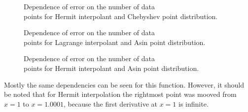 \documentclass[10pt]{article}
\begin{document}
\begin{figure}[H]
\begin{minipage}[h]{0.45\linewidth}
			\caption{Dependence of error on the number of data\\ points for Hermit interpolant and Chebyshev point distribution.}
		\end{minipage}%
		\vfill
		\begin{minipage}[h]{0.45\linewidth}
			\caption{Dependence of error on the number of data\\ points for Lagrange interpolant and Asin point distribution.}
		\end{minipage}%
		\hspace{0.5cm}
		\begin{minipage}[h]{0.45\linewidth}
			\caption{Dependence of error on the number of data\\ points for Hermit interpolant and Asin point distribution.}
		\end{minipage}%
	\end{figure}
Mostly the same dependencies can be seen for this function. However, it should be noted that for Hermit interpolation the rightmost point was mooved from $x=1$ to $x=1.0001$, because the first derivative at $x=1$ is infinite.
	\newpage
\end{document}
